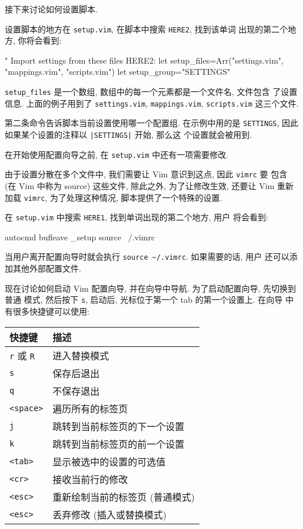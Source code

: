 接下来讨论如何设置脚本.

设置脚本的地方在 \texttt{setup.vim}, 在脚本中搜索 \texttt{HERE2}, 找到该单词
出现的第二个地方, 你将会看到:
\begin{vimcode}
" Import settings from these files HERE2:
let setup_files=Arr("settings.vim", "mappings.vim", "scripts.vim")
let setup_group="SETTINGS"
\end{vimcode}

\texttt{setup\_files} 是一个数组, 数组中的每一个元素都是一个文件名, 文件包含
了设置信息. 上面的例子用到了 \texttt{settings.vim},
\texttt{mappings.vim}, \texttt{scripts.vim} 这三个文件.

第二条命令告诉脚本当前设置使用哪一个配置组. 在示例中用的是
\texttt{SETTINGS}, 因此如果某个设置的注释以 \texttt{|SETTINGS|} 开始, 那么这
个设置就会被用到.

在开始使用配置向导之前, 在 \texttt{setup.vim} 中还有一项需要修改.

由于设置分散在多个文件中, 我们需要让 Vim 意识到这点, 因此 \texttt{vimrc} 要
包含 (在 Vim 中称为 source) 这些文件, 除此之外, 为了让修改生效, 还要让 Vim
重新加载 \texttt{vimrc}, 为了处理这种情况, 脚本提供了一个特殊的设置.

在 \texttt{setup.vim} 中搜索 \texttt{HERE1}, 找到单词出现的第二个地方, 用户
将会看到:
\begin{vimcode}
autocmd bufleave _setup source ~/.vimrc
\end{vimcode}
当用户离开配置向导时就会执行 \verb'source ~/.vimrc'. 如果需要的话, 用户
还可以添加其他外部配置文件.

现在讨论如何启动 Vim 配置向导, 并在向导中导航. 为了启动配置向导, 先切换到普通
模式, 然后按下 \texttt{s}, 启动后, 光标位于第一个 tab 的第一个设置上. 在向导
中有很多快捷键可以使用:
\begin{center}
  \begin{tabular}{ll}
    \hline
	快捷键  & 描述 \\
    \hline
    \texttt{r} 或 \texttt{R}  & 进入替换模式 \\
	\texttt{s} & 保存后退出 \\
	\texttt{q} & 不保存退出 \\
	\texttt{<space>} & 遍历所有的标签页 \\
	\texttt{j} & 跳转到当前标签页的下一个设置 \\
	\texttt{k} & 跳转到当前标签页的前一个设置 \\
	\texttt{<tab>} & 显示被选中的设置的可选值 \\
	\texttt{<cr>} & 接收当前行的修改 \\
	\texttt{<esc>} & 重新绘制当前的标签页 (普通模式) \\
	\texttt{<esc>} & 丢弃修改 (插入或替换模式) \\
	\hline
  \end{tabular}
\end{center}

